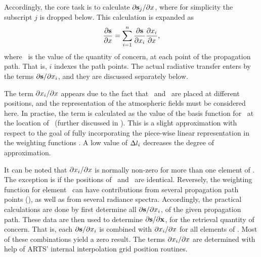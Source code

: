 Accordingly, the core task is to calculate $\partial{\bf s}_{j}/\partial x$,
where for simplicity the subscript $j$ is dropped below. This calculation is
expanded as
\begin{equation}
  \frac{\partial{\bf s}}{\partial x} = \sum_{i=1}^n
    \frac{\partial{\bf s}}{\partial x_{i}}
    \frac{\partial x_{i}}{\partial x},
\end{equation}
where \ is the value of the quantity of concern, at each point of
the propagation path. That is, $i$ indexes the path points. The actual
radiative transfer enters by the terms $\partial{\bf s}/\partial x_{i}$, and
they are discussed separately below.

The term $\partial x_{i}/\partial x$ appears due to the fact that
\ and \SttElm\ are placed at different positions, and the
representation of the atmospheric fields must be considered here. In practise,
the term is calculated as the value of the basis function for \SttElm\ at the
location of \ (further discussed in \citet{buehler:artst:05}). This
is a slight approximation with respect to the goal of fully incorporating the
piece-wise linear representation in the weighting functions
\citep{buehler:artst:05}. A low value of $\Delta l_{i}$ decreases the
degree of approximation.

It can be noted that $\partial x_{i} / \partial x$ is normally non-zero
for more than one element of \SttVct. The exception is if the positions of
\ and \SttElm\ are identical. Reversely, the weighting function for
element \SttElm\ can have contributions from several propagation path points
(), as well as from several radiance spectra. Accordingly, the
practical calculations are done by first determine all
$\partial{\bf s}/\partial x_{i}$, of the given propagation path. These data
are then used to determine $\partial{\bf s}/\partial\mathbf{x}$, for the retrieval
quantity of concern. That is, each $\partial{\bf s}/\partial x_{i}$ is
combined with $\partial x_{i}/\partial x$ for all elements of \SttVct.
Most of these combinations yield a zero result. The terms
$\partial x_{i}/\partial x$ are determined with help of ARTS' internal
interpolation grid position routines.



